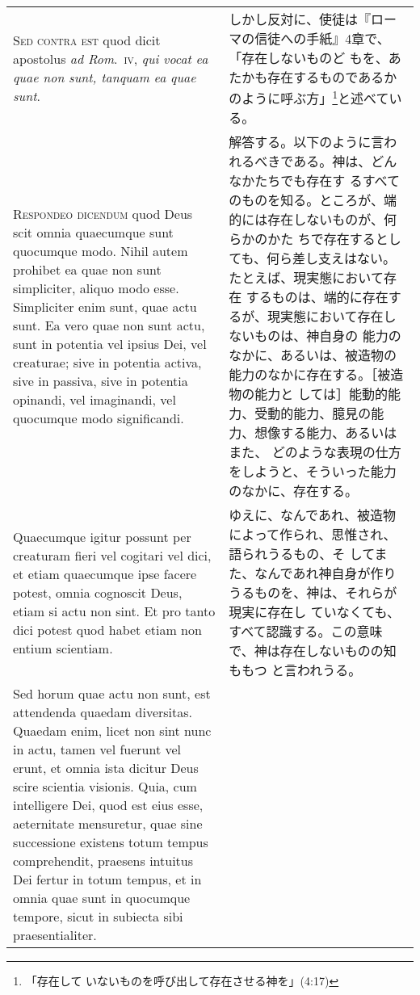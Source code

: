 \documentclass[10pt]{jsarticle} %
\begin{document}
\begin{longtable}{p{21em}p{21em}}
\\



{\scshape Sed contra est} quod dicit apostolus {\itshape ad
Rom}.~{\scshape iv}, {\itshape qui vocat ea quae non sunt, tanquam ea
quae sunt}.

&

しかし反対に、使徒は『ローマの信徒への手紙』4章で、「存在しないものど
もを、あたかも存在するものであるかのように呼ぶ方」\footnote{「存在して
いないものを呼び出して存在させる神を」(4:17)}と述べている。


\\



{\scshape Respondeo dicendum} quod Deus scit omnia quaecumque sunt
quocumque modo. Nihil autem prohibet ea quae non sunt simpliciter,
aliquo modo esse. Simpliciter enim sunt, quae actu sunt. Ea vero quae
non sunt actu, sunt in potentia vel ipsius Dei, vel creaturae; sive in
potentia activa, sive in passiva, sive in potentia opinandi, vel
imaginandi, vel quocumque modo significandi.

&

解答する。以下のように言われるべきである。神は、どんなかたちでも存在す
るすべてのものを知る。ところが、端的には存在しないものが、何らかのかた
ちで存在するとしても、何ら差し支えはない。たとえば、現実態において存在
するものは、端的に存在するが、現実態において存在しないものは、神自身の
能力のなかに、あるいは、被造物の能力のなかに存在する。［被造物の能力と
しては］能動的能力、受動的能力、臆見の能力、想像する能力、あるいはまた、
どのような表現の仕方をしようと、そういった能力のなかに、存在する。

\\



Quaecumque igitur possunt per creaturam fieri vel cogitari vel dici,
et etiam quaecumque ipse facere potest, omnia cognoscit Deus, etiam si
actu non sint. Et pro tanto dici potest quod habet etiam non entium
scientiam.

&

ゆえに、なんであれ、被造物によって作られ、思惟され、語られうるもの、そ
してまた、なんであれ神自身が作りうるものを、神は、それらが現実に存在し
ていなくても、すべて認識する。この意味で、神は存在しないものの知ももつ
と言われうる。


\\


Sed horum quae actu non sunt, est attendenda quaedam diversitas.
Quaedam enim, licet non sint nunc in actu, tamen vel fuerunt vel
erunt, et omnia ista dicitur Deus scire scientia visionis. Quia, cum
intelligere Dei, quod est eius esse, aeternitate mensuretur, quae sine
successione existens totum tempus comprehendit, praesens intuitus Dei
fertur in totum tempus, et in omnia quae sunt in quocumque tempore,
sicut in subiecta sibi praesentialiter.


\end{longtable}
\end{document}
